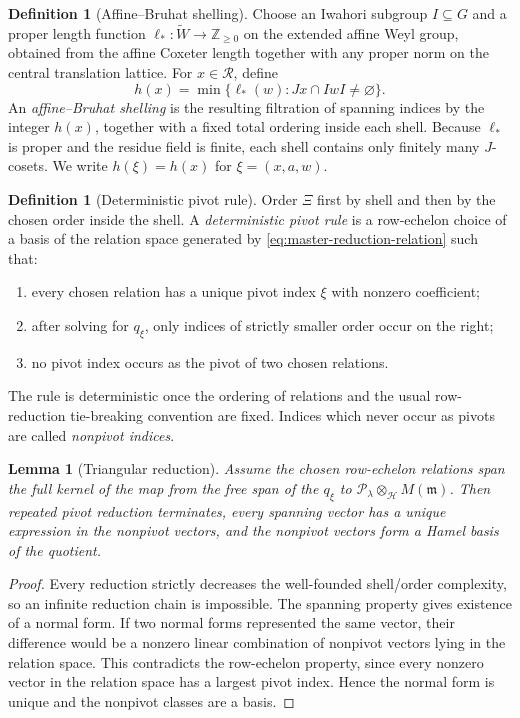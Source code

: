 \documentclass[12pt]{article}
\newtheorem{lemma}[theorem]{Lemma}
\theoremstyle{definition}
\newtheorem{definition}[theorem]{Definition}
\theoremstyle{remark}
\begin{document}
\begin{definition}[Affine--Bruhat shelling]
\label{def:affine-Bruhat-shelling}
Choose an Iwahori subgroup $I\subseteq G$ and a proper length function
$\ell_*:\widetilde W\to\mathbb Z_{\geq0}$ on the extended affine Weyl group,
obtained from the affine Coxeter length together with any proper norm on the
central translation lattice.  For $x\in\mathscr R$, define
\[
 h(x)=\min\{\ell_*(w):Jx\cap IwI\neq\varnothing\}.
\]
An \emph{affine--Bruhat shelling} is the resulting filtration of spanning
indices by the integer $h(x)$, together with a fixed total ordering inside
each shell.  Because $\ell_*$ is proper and the residue field is finite, each
shell contains only finitely many $J$-cosets.  We write $h(\xi)=h(x)$ for
$\xi=(x,a,w)$.
\end{definition}

\begin{definition}[Deterministic pivot rule]
\label{def:deterministic-pivot-rule}
Order $\Xi$ first by shell and then by the chosen order inside the shell.
A \emph{deterministic pivot rule} is a row-echelon choice of a basis of the
relation space generated by \eqref{eq:master-reduction-relation} such that:
\begin{enumerate}
 \item every chosen relation has a unique pivot index $\xi$ with nonzero
 coefficient;
 \item after solving for $q_\xi$, only indices of strictly smaller order
 occur on the right;
 \item no pivot index occurs as the pivot of two chosen relations.
\end{enumerate}
The rule is deterministic once the ordering of relations and the usual
row-reduction tie-breaking convention are fixed.  Indices which never occur
as pivots are called \emph{nonpivot indices}.
\end{definition}

\begin{lemma}[Triangular reduction]
\label{lem:triangular-reduction-normal-form}
Assume the chosen row-echelon relations span the full kernel of the map from
the free span of the $q_\xi$ to
$\mathcal P_\lambda\otimes_{\mathcal H}M(\mathfrak m)$.  Then repeated pivot
reduction terminates, every spanning vector has a unique expression in the
nonpivot vectors, and the nonpivot vectors form a Hamel basis of the
quotient.
\end{lemma}

\begin{proof}
Every reduction strictly decreases the well-founded shell/order complexity,
so an infinite reduction chain is impossible.  The spanning property gives
existence of a normal form.  If two normal forms represented the same vector,
their difference would be a nonzero linear combination of nonpivot vectors
lying in the relation space.  This contradicts the row-echelon property,
since every nonzero vector in the relation space has a largest pivot index.
Hence the normal form is unique and the nonpivot classes are a basis.
\end{proof}
\end{document}

